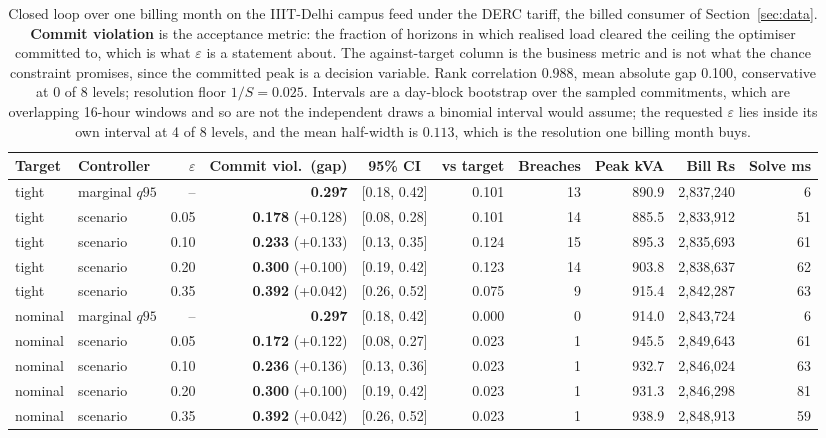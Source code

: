 \begin{table}[t]
\centering
\footnotesize
\setlength{\tabcolsep}{3.5pt}
\begin{tabular}{llrrcrrrrr}
\toprule
Target & Controller & $\varepsilon$ & Commit viol.\ (gap) & 95\% CI & vs target & Breaches & Peak kVA & Bill Rs & Solve ms \\
\midrule
tight & marginal $q95$ & -- & \textbf{0.297} & [0.18, 0.42] & 0.101 & 13 & 890.9 & 2,837,240 & 6 \\
tight & scenario & 0.05 & \textbf{0.178} (+0.128) & [0.08, 0.28] & 0.101 & 14 & 885.5 & 2,833,912 & 51 \\
tight & scenario & 0.10 & \textbf{0.233} (+0.133) & [0.13, 0.35] & 0.124 & 15 & 895.3 & 2,835,693 & 61 \\
tight & scenario & 0.20 & \textbf{0.300} (+0.100) & [0.19, 0.42] & 0.123 & 14 & 903.8 & 2,838,637 & 62 \\
tight & scenario & 0.35 & \textbf{0.392} (+0.042) & [0.26, 0.52] & 0.075 & 9 & 915.4 & 2,842,287 & 63 \\
nominal & marginal $q95$ & -- & \textbf{0.297} & [0.18, 0.42] & 0.000 & 0 & 914.0 & 2,843,724 & 6 \\
nominal & scenario & 0.05 & \textbf{0.172} (+0.122) & [0.08, 0.27] & 0.023 & 1 & 945.5 & 2,849,643 & 61 \\
nominal & scenario & 0.10 & \textbf{0.236} (+0.136) & [0.13, 0.36] & 0.023 & 1 & 932.7 & 2,846,024 & 63 \\
nominal & scenario & 0.20 & \textbf{0.300} (+0.100) & [0.19, 0.42] & 0.023 & 1 & 931.3 & 2,846,298 & 81 \\
nominal & scenario & 0.35 & \textbf{0.392} (+0.042) & [0.26, 0.52] & 0.023 & 1 & 938.9 & 2,848,913 & 59 \\
\bottomrule
\end{tabular}
\caption{Closed loop over one billing month on the IIIT-Delhi campus feed under the DERC tariff, the billed consumer of Section~\ref{sec:data}. \textbf{Commit violation} is the acceptance metric: the fraction of horizons in which realised load cleared the ceiling the optimiser committed to, which is what $\varepsilon$ is a statement about. The against-target column is the business metric and is not what the chance constraint promises, since the committed peak is a decision variable. Rank correlation 0.988, mean absolute gap 0.100, conservative at 0 of 8 levels; resolution floor $1/S=0.025$. Intervals are a day-block bootstrap over the sampled commitments, which are overlapping 16-hour windows and so are not the independent draws a binomial interval would assume; the requested $\varepsilon$ lies inside its own interval at 4 of 8 levels, and the mean half-width is $0.113$, which is the resolution one billing month buys.}
\label{tab:acceptance-campus}
\end{table}
